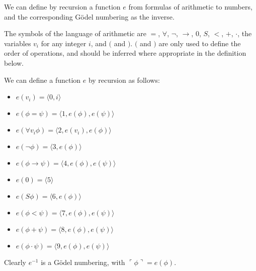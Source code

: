 \documentclass[12pt]{article}
\begin{document}
We can define by recursion a function $e$ from formulas of arithmetic to numbers, and the corresponding G\"odel numbering as the inverse.

The symbols of the language of arithmetic are $=$, $\forall$, $\neg$, $\rightarrow$, $0$, $S$, $<$, $+$, $\cdot$, the variables $v_i$ for any integer $i$, and $($ and $)$.  $($ and $)$ are only used to define the order of operations, and should be inferred where appropriate in the definition below.

We can define a function $e$ by recursion as follows:

\begin{itemize}
\item $e(v_i)=\langle 0,i\rangle$

\item $e(\phi=\psi)=\langle 1,e(\phi),e(\psi)\rangle$

\item $e(\forall v_i \phi)=\langle 2,e(v_i),e(\phi)\rangle$

\item $e(\neg\phi)=\langle 3,e(\phi)\rangle$

\item $e(\phi\rightarrow\psi)=\langle 4,e(\phi),e(\psi)\rangle$

\item $e(0)=\langle 5\rangle$

\item $e(S\phi)=\langle 6,e(\phi)\rangle$

\item $e(\phi<\psi)=\langle 7,e(\phi),e(\psi)\rangle$

\item $e(\phi+\psi)=\langle 8,e(\phi),e(\psi)\rangle$

\item $e(\phi\cdot\psi)=\langle 9,e(\phi),e(\psi)\rangle$
\end{itemize}

Clearly $e^{-1}$ is a G\"odel numbering, with $\ulcorner\phi\urcorner=e(\phi)$.
\end{document}

